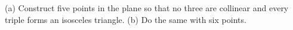 (a) Construct five points in the plane so that no three are collinear and every triple forms an isosceles triangle. (b) Do the same with six points.
